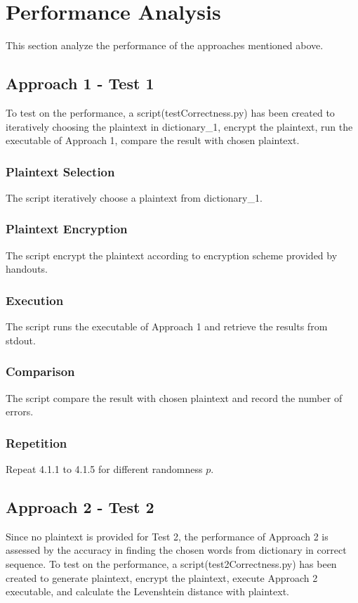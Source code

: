 \documentclass[12pt]{article}
\begin{document}
\section{Performance Analysis}
This section analyze the performance of the approaches mentioned above.
\subsection{Approach 1 - Test 1}
To test on the performance, a script(testCorrectness.py) has been created to iteratively choosing the plaintext in dictionary\_1, encrypt the plaintext, run the executable of Approach 1, compare the result with chosen plaintext.
\subsubsection{Plaintext Selection}
The script iteratively choose a plaintext from dictionary_1.
\subsubsection{Plaintext Encryption}
The script encrypt the plaintext according to encryption scheme provided by handouts.
\subsubsection{Execution}
The script runs the executable of Approach 1 and retrieve the results from stdout.
\subsubsection{Comparison}
The script compare the result with chosen plaintext and record the number of errors.
\subsubsection{Repetition}
Repeat 4.1.1 to 4.1.5 for different randomness $p$. \\

\subsection{Approach 2 - Test 2}
Since no plaintext is provided for Test 2, the performance of Approach 2 is assessed by the accuracy in finding the chosen words from dictionary in correct sequence. To test on the performance, a script(test2Correctness.py) has been created to generate plaintext, encrypt the plaintext, execute Approach 2 executable, and calculate the Levenshtein distance with plaintext.
\end{document}
